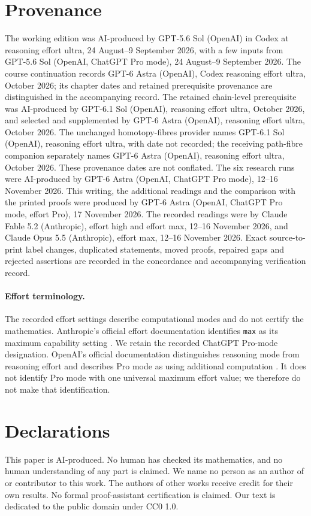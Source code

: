 \section{Provenance}
The working edition was AI-produced by GPT-5.6 Sol (OpenAI) in Codex at
reasoning effort ultra, 24 August--9 September 2026, with a few inputs from
GPT-5.6 Sol (OpenAI, ChatGPT Pro mode), 24 August--9 September 2026.
The course continuation records GPT-6 Astra (OpenAI), Codex reasoning
effort ultra, October 2026; its chapter dates and retained prerequisite
provenance are distinguished in the accompanying record.
The retained chain-level prerequisite was AI-produced by GPT-6.1 Sol
(OpenAI), reasoning effort ultra, October 2026, and selected and supplemented
by GPT-6 Astra (OpenAI), reasoning effort ultra, October 2026.
The unchanged homotopy-fibres provider names GPT-6.1 Sol (OpenAI),
reasoning effort ultra, with date not recorded; the receiving path-fibre
companion separately names GPT-6 Astra (OpenAI), reasoning effort ultra,
October 2026. These provenance dates are not conflated.
The six research runs were AI-produced by GPT-6 Astra (OpenAI, ChatGPT Pro
mode), 12--16 November 2026. This writing, the additional readings and the
comparison with the printed proofs were produced by GPT-6 Astra (OpenAI,
ChatGPT Pro mode, effort Pro), 17 November 2026.
The recorded readings were by Claude Fable 5.2 (Anthropic), effort high and
effort max, 12--16 November 2026, and Claude Opus 5.5 (Anthropic), effort max,
12--16 November 2026. Exact source-to-print label changes, duplicated
statements, moved proofs, repaired gaps and rejected assertions are recorded
in the concordance and accompanying verification record.

\paragraph{Effort terminology.}
The recorded effort settings describe computational modes and do not certify
the mathematics. Anthropic's official effort documentation identifies
\texttt{max} as its maximum capability setting
\cite[How effort works; Effort levels]{AnthropicEffort2026}.
We retain the recorded ChatGPT Pro-mode designation.
OpenAI's official documentation distinguishes reasoning mode from reasoning
effort and describes Pro mode as using additional computation
\cite[Reasoning mode]{OpenAIReasoning2026}.
It does not identify Pro mode with one universal maximum effort value; we
therefore do not make that identification.

\section{Declarations}
This paper is AI-produced. No human has checked its mathematics, and no
human understanding of any part is claimed. We name no person as an author
of or contributor to this work. The authors of other works receive credit
for their own results. No formal proof-assistant certification is claimed.
Our text is dedicated to the public domain under CC0 1.0.

